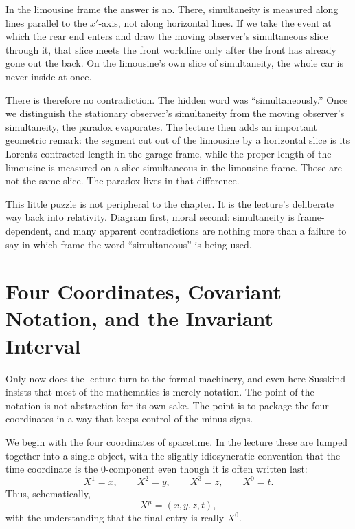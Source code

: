 In the limousine frame the answer is no. There, simultaneity is measured along lines parallel to the \(x'\)-axis, not along horizontal lines. If we take the event at which the rear end enters and draw the moving observer's simultaneous slice through it, that slice meets the front worldline only after the front has already gone out the back. On the limousine's own slice of simultaneity, the whole car is never inside at once.

There is therefore no contradiction. The hidden word was ``simultaneously.'' Once we distinguish the stationary observer's simultaneity from the moving observer's simultaneity, the paradox evaporates. The lecture then adds an important geometric remark: the segment cut out of the limousine by a horizontal slice is its Lorentz-contracted length in the garage frame, while the proper length of the limousine is measured on a slice simultaneous in the limousine frame. Those are not the same slice. The paradox lives in that difference.

This little puzzle is not peripheral to the chapter. It is the lecture's deliberate way back into relativity. Diagram first, moral second: simultaneity is frame-dependent, and many apparent contradictions are nothing more than a failure to say in which frame the word ``simultaneous'' is being used.

\section{Four Coordinates, Covariant Notation, and the Invariant Interval}

Only now does the lecture turn to the formal machinery, and even here Susskind insists that most of the mathematics is merely notation. The point of the notation is not abstraction for its own sake. The point is to package the four coordinates in a way that keeps control of the minus signs.

We begin with the four coordinates of spacetime. In the lecture these are lumped together into a single object, with the slightly idiosyncratic convention that the time coordinate is the \(0\)-component even though it is often written last:
\begin{equation}
X^1 = x,\qquad X^2 = y,\qquad X^3 = z,\qquad X^0 = t.
\end{equation}
Thus, schematically,
\begin{equation}
X^\mu = (x,y,z,t),
\end{equation}
with the understanding that the final entry is really \(X^0\).

